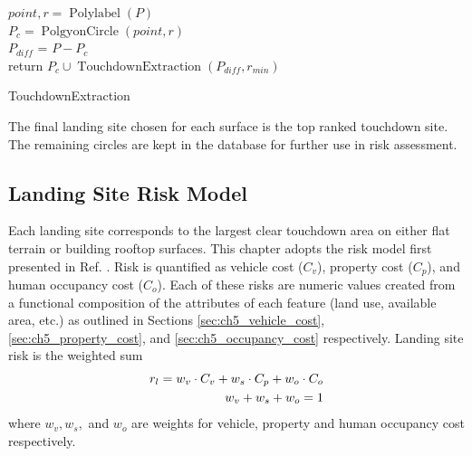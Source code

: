 \begin{algorithm}
    \SetStartEndCondition{ }{}{}%

    
    $point, r = \operatorname{Polylabel}(P)$ \\
    $P_{c} = \operatorname{PolgyonCircle}(point, r)$ \\
    $P_{diff}$ = $P - P_{c}$ \\
    return $P_{c} \cup \operatorname{TouchdownExtraction}(P_{diff}, r_{min})$
    \caption{TouchdownExtraction}
    \label{alg:ch5_touchdown_extraction}
\end{algorithm}

The final landing site chosen for each surface is the top ranked touchdown site. The remaining circles are kept in the database for further use in risk assessment.

\subsection{Landing Site Risk Model}\label{sec:ch5_risk_model}

Each landing site corresponds to the largest clear touchdown area on either flat terrain or building rooftop surfaces. This chapter adopts the risk model first presented in Ref. \cite{castagno_comprehensive_2018}.  Risk is quantified as vehicle cost ($C_v$), property cost ($C_p$), and human occupancy cost ($C_o$). Each of these risks are numeric values created from a functional composition of the attributes of each feature (land use, available area, etc.) as outlined in Sections \ref{sec:ch5_vehicle_cost}, \ref{sec:ch5_property_cost}, and \ref{sec:ch5_occupancy_cost} respectively. Landing site risk is the weighted sum
\begin{align}\label{eq:landing_site_risk}
    r_l = w_v \cdot C_v + w_s \cdot C_p + w_o \cdot C_o \\
    w_v + w_s + w_o = 1 \notag
\end{align}
where $w_v, w_s,$ and $w_o$ are weights for vehicle, property and human occupancy cost respectively.

